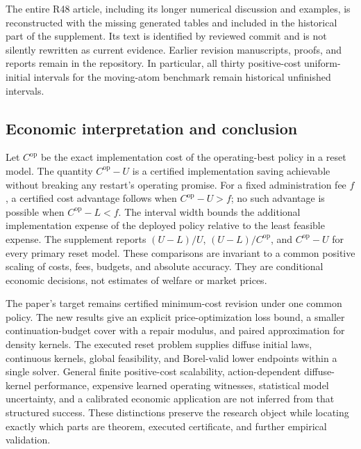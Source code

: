 The entire R48 article, including its longer numerical discussion and examples, is reconstructed with the missing generated tables and included in the historical part of the supplement. Its text is identified by reviewed commit and is not silently rewritten as current evidence. Earlier revision manuscripts, proofs, and reports remain in the repository. In particular, all thirty positive-cost uniform-initial intervals for the moving-atom benchmark remain historical unfinished intervals.

\subsection{Economic interpretation and conclusion}
Let $C^{\mathrm{op}}$ be the exact implementation cost of the operating-best policy in a reset model. The quantity $C^{\mathrm{op}}-U$ is a certified implementation saving achievable without breaking any restart's operating promise. For a fixed administration fee $f$, a certified cost advantage follows when $C^{\mathrm{op}}-U>f$; no such advantage is possible when $C^{\mathrm{op}}-L<f$. The interval width bounds the additional implementation expense of the deployed policy relative to the least feasible expense. The supplement reports $(U-L)/U$, $(U-L)/C^{\mathrm{op}}$, and $C^{\mathrm{op}}-U$ for every primary reset model. These comparisons are invariant to a common positive scaling of costs, fees, budgets, and absolute accuracy. They are conditional economic decisions, not estimates of welfare or market prices.

The paper's target remains certified minimum-cost revision under one common policy. The new results give an explicit price-optimization loss bound, a smaller continuation-budget cover with a repair modulus, and paired approximation for density kernels. The executed reset problem supplies diffuse initial laws, continuous kernels, global feasibility, and Borel-valid lower endpoints within a single solver. General finite positive-cost scalability, action-dependent diffuse-kernel performance, expensive learned operating witnesses, statistical model uncertainty, and a calibrated economic application are not inferred from that structured success. These distinctions preserve the research object while locating exactly which parts are theorem, executed certificate, and further empirical validation.
